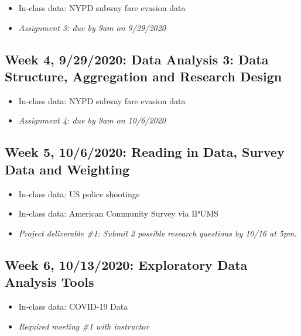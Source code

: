 \documentclass[11pt,]{article}
\providecommand{\tightlist}{%
  \setlength{\itemsep}{0pt}\setlength{\parskip}{0pt}}
\begin{document}
\begin{itemize}
\tightlist
\item
  In-class data: NYPD subway fare evasion data
\item
  \emph{Assignment 3: due by 9am on 9/29/2020} \medskip
\end{itemize}

\hypertarget{week-4-9292020-data-analysis-3-data-structure-aggregation-and-research-design}{%
\subsection{Week 4, 9/29/2020: Data Analysis 3: Data Structure,
Aggregation and Research
Design}\label{week-4-9292020-data-analysis-3-data-structure-aggregation-and-research-design}}

\begin{itemize}
\tightlist
\item
  In-class data: NYPD subway fare evasion data
\item
  \emph{Assignment 4: due by 9am on 10/6/2020} \medskip
\end{itemize}

\hypertarget{week-5-1062020-reading-in-data-survey-data-and-weighting}{%
\subsection{Week 5, 10/6/2020: Reading in Data, Survey Data and
Weighting}\label{week-5-1062020-reading-in-data-survey-data-and-weighting}}

\begin{itemize}
\tightlist
\item
  In-class data: US police shootings
\item
  In-class data: American Community Survey via IPUMS
\item
  \emph{Project deliverable \#1: Submit 2 possible research questions by
  10/16 at 5pm.} \medskip
\end{itemize}

\hypertarget{week-6-10132020-exploratory-data-analysis-tools}{%
\subsection{Week 6, 10/13/2020: Exploratory Data Analysis
Tools}\label{week-6-10132020-exploratory-data-analysis-tools}}

\begin{itemize}
\tightlist
\item
  In-class data: COVID-19 Data
\item
  \emph{Required meeting \#1 with instructor} \medskip
\end{itemize}
\end{document}
